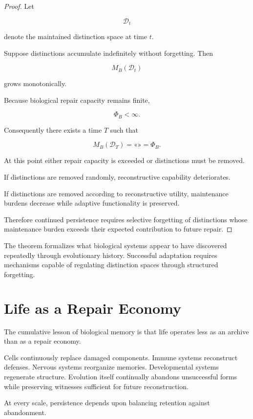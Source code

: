 \documentclass[12pt,oneside]{book}
\theoremstyle{plain} \newtheorem{theorem}{Theorem}[chapter] \newtheorem{lemma}[theorem]{Lemma} \newtheorem{proposition}[theorem]{Proposition} \newtheorem{corollary}[theorem]{Corollary}
\theoremstyle{definition} \newtheorem{definition}[theorem]{Definition} \newtheorem{axiom}[theorem]{Axiom} \newtheorem{construction}[theorem]{Construction}
\theoremstyle{remark} \newtheorem{remark}[theorem]{Remark} \newtheorem{example}[theorem]{Example}
\newcommand{\D}{\mathcal{D}} \newcommand{\R}{\mathcal{R}} \newcommand{\F}{\mathcal{F}} \newcommand{\U}{\mathcal{U}} \newcommand{\M}{\mathcal{M}} \newcommand{\G}{\Gamma}
\begin{document}
\begin{proof}

Let

\[
\D_t
\]

denote the maintained distinction space at time $t$.

Suppose distinctions accumulate indefinitely without forgetting. Then

\[
M_B(\D_t)
\]

grows monotonically.

Because biological repair capacity remains finite,

\[
\Phi_B < \infty.
\]

Consequently there exists a time $T$ such that

\[
M_B(\D_T)
=
«»
=
\Phi_B.
\]

At this point either repair capacity is exceeded or distinctions must be removed.

If distinctions are removed randomly, reconstructive capability deteriorates.

If distinctions are removed according to reconstructive utility, maintenance burdens decrease while adaptive functionality is preserved.

Therefore continued persistence requires selective forgetting of distinctions whose maintenance burden exceeds their expected contribution to future repair.

\end{proof}

The theorem formalizes what biological systems appear to have discovered repeatedly through evolutionary history. Successful adaptation requires mechanisms capable of regulating distinction spaces through structured forgetting.

\section{Life as a Repair Economy}

The cumulative lesson of biological memory is that life operates less as an archive than as a repair economy.

Cells continuously replace damaged components. Immune systems reconstruct defenses. Nervous systems reorganize memories. Developmental systems regenerate structure. Evolution itself continually abandons unsuccessful forms while preserving witnesses sufficient for future reconstruction.

At every scale, persistence depends upon balancing retention against abandonment.
\end{document}
